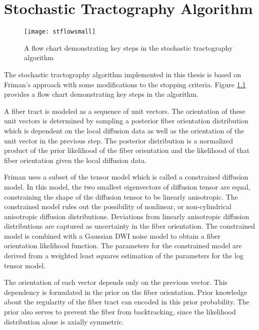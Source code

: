 \chapter{Stochastic Tractography Algorithm}
\begin{figure}
  \center 
	\texttt{[image: stflowsmall]}
	\caption{A flow chart demonstrating key steps in the stochastic tractography algorithm}
	 \label{fig:stflow}
\end{figure}
The stochastic tractography algorithm implemented in this thesis is based on Friman's \cite{frimanTMI06} approach with some modifications to the stopping criteria.  Figure \ref{fig:stflow} provides a flow chart demonstrating key steps in the algorithm. 

A fiber tract is modeled as a sequence of unit vectors.  The orientation of these unit vectors is determined by sampling a posterior fiber orientation distribution which is dependent on the local diffusion data as well as the orientation of the unit vector in the previous step.  The posterior distribution is a normalized product of the prior likelihood of the fiber orientation and the likelihood of that fiber orientation given the local diffusion data.

Friman uses a subset of the tensor model which is called a constrained diffusion model.  In this model, the two smallest eigenvectors of diffusion tensor are equal, constraining the shape of the diffusion tensor to be linearly anisotropic.  The constrained model rules out the possibility of nonlinear, or non-cylindrical anisotropic diffusion distributions.  Deviations from linearly anisotropic diffusion distributions are captured as uncertainty in the fiber orientation.  The constrained model is combined with a Gaussian DWI noise model to obtain a fiber orientation likelihood function.  The parameters for the constrained model are derived from a weighted least squares estimation of the parameters for the log tensor model.

The orientation of each vector depends only on the previous vector.  This dependency is formulated in the prior on the fiber orientation.  Prior knowledge about the regularity of the fiber tract can encoded in this prior probability.  The prior also serves to prevent the fiber from backtracking, since the likelihood distribution alone is axially symmetric.

